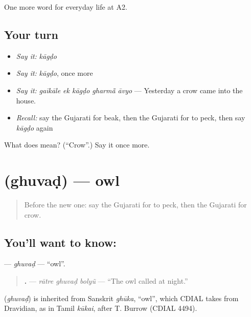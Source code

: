 \begin{grammarlens}[title={What you've built}]
One more word for everyday life at A2.
\end{grammarlens}

\subsection*{Your turn}
\begin{itemize}
\raggedright
  \item \emph{Say it:} \emph{kāgḍo}
  \item \emph{Say it:} \emph{kāgḍo}, once more
  \item \emph{Say it:} \emph{gaīkāle ek kāgḍo gharmā̃ āvyo} — Yesterday a crow came into the house.
  \item \emph{Recall:} say the Gujarati for beak, then the Gujarati for to peck, then say \emph{kāgḍo} again
\end{itemize}

\begin{tcolorbox}[breakable,colback=teal!4,colframe=teal!35!black,title={Before you move on}]
What does  mean? (\textquotedblleft{}Crow\textquotedblright{}.) Say it once more.
\end{tcolorbox}
\section[\texorpdfstring{\gu{ઘુવડ} (ghuvaḍ)}{ઘુવડ (ghuvaḍ)}]{ (ghuvaḍ) — owl}

\label{lesson:GU-C237-ghuvad}



\begin{quote}
Before the new one: say the Gujarati for to peck, then the Gujarati for crow.
\end{quote}

\subsection*{You'll want to know: }
\textbf{} — \emph{ghuvaḍ} — \textquotedblleft{}owl\textquotedblright{}.

\begin{quote}
\textbf{  .} — \emph{rātre ghuvaḍ bolyũ} — \textquotedblleft{}The owl called at night.\textquotedblright{}
\end{quote}

\begin{cousinweb}
\textbf{} (\emph{ghuvaḍ}) is inherited from Sanskrit \emph{ghūka}, \textquotedblleft{}owl\textquotedblright{}, which CDIAL takes from Dravidian, as in Tamil \emph{kūkai}, after T. Burrow (CDIAL 4494).
\end{cousinweb}


